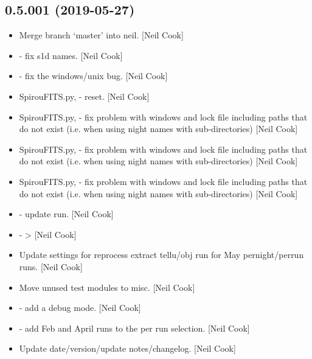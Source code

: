 \documentclass[a4paper,10pt,english]{report}
\begin{document}
\subsection{0.5.001 (2019-05-27)}
\label{\detokenize{misc/changelog:id136}}\begin{itemize}
\item {} 
Merge branch ‘master’ into neil. {[}Neil Cook{]}

\item {} 
 - fix s1d names. {[}Neil Cook{]}

\item {} 
 - fix the windows/unix  bug. {[}Neil Cook{]}

\item {} 
SpirouFITS.py,  - reset. {[}Neil Cook{]}

\item {} 
SpirouFITS.py,  - fix problem with windows and lock file
including paths that do not exist (i.e. when using night names with
sub-directories) {[}Neil Cook{]}

\item {} 
SpirouFITS.py,  - fix problem with windows and lock file
including paths that do not exist (i.e. when using night names with
sub-directories) {[}Neil Cook{]}

\item {} 
SpirouFITS.py,  - fix problem with windows and lock file
including paths that do not exist (i.e. when using night names with
sub-directories) {[}Neil Cook{]}

\item {} 
 - update run. {[}Neil Cook{]}

\item {} 
 -  \textendash{}\textgreater{}  {[}Neil Cook{]}

\item {} 
Update settings for reprocess extract tellu/obj run for May
pernight/perrun runs. {[}Neil Cook{]}

\item {} 
Move unused test modules to misc. {[}Neil Cook{]}

\item {} 
 - add a debug mode. {[}Neil Cook{]}

\item {} 
 - add Feb and April runs to the per
run selection. {[}Neil Cook{]}

\item {} 
Update date/version/update notes/changelog. {[}Neil Cook{]}

\end{itemize}
\end{document}

